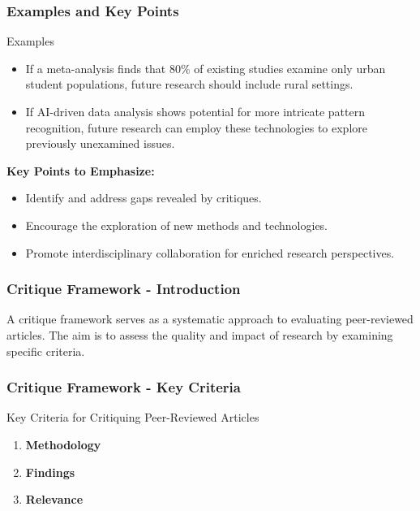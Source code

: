 \documentclass[aspectratio=169]{beamer}
\begin{document}
\begin{frame}[fragile]
    \frametitle{Examples and Key Points}
    \begin{block}{Examples}
        \begin{itemize}
            \item If a meta-analysis finds that 80\% of existing studies examine only urban student populations, future research should include rural settings.
            \item If AI-driven data analysis shows potential for more intricate pattern recognition, future research can employ these technologies to explore previously unexamined issues.
        \end{itemize}
    \end{block}

    \textbf{Key Points to Emphasize:}
    \begin{itemize}
        \item Identify and address gaps revealed by critiques.
        \item Encourage the exploration of new methods and technologies.
        \item Promote interdisciplinary collaboration for enriched research perspectives.
    \end{itemize}
\end{frame}

\begin{frame}[fragile]
    \frametitle{Critique Framework - Introduction}
    A critique framework serves as a systematic approach to evaluating peer-reviewed articles. The aim is to assess the quality and impact of research by examining specific criteria.
\end{frame}

\begin{frame}[fragile]
    \frametitle{Critique Framework - Key Criteria}
    \begin{block}{Key Criteria for Critiquing Peer-Reviewed Articles}
        \begin{enumerate}
            \item \textbf{Methodology}
            \item \textbf{Findings}
            \item \textbf{Relevance}
        \end{enumerate}
    \end{block}
\end{frame}
\end{document}
